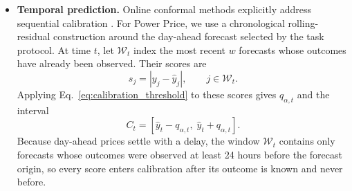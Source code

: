 \documentclass[preprint,12pt,authoryear]{elsarticle}
\begin{document}
\begin{itemize}
    A correctness scorer, trained on a separate scorer-training split
    and then frozen, produces \(r_i\in[0,1]\) from the observable task
    category and the generated selections. Calibration uses
    \begin{equation}
        s_i
        =
        Z_i(1-r_i)+(1-Z_i)r_i,
        \label{eq:statqa_nonconformity}
    \end{equation}
    yielding the correctness set
    \begin{equation}
        C_i
        =
        \left\{
            z\in\{0,1\}:
            z(1-r_i)+(1-z)r_i\leq\widehat q_\alpha
        \right\}.
        \label{eq:statqa_correctness_set}
    \end{equation}
    Reference answers supply offline training and calibration labels
    but are excluded from the scorer's inputs when assessing a new
    candidate. Thus, the calibrated target concerns the benchmark's
    structured analytical choices rather than unrestricted
    natural-language factuality.

    \item \textbf{Temporal prediction.}
    Online conformal methods explicitly address sequential calibration
    \citep{angelopoulos2024online}. For Power Price, we use a
    chronological rolling-residual construction around the day-ahead forecast selected by the task protocol. At time \(t\), let
    \(\mathcal{W}_t\) index the most recent \(w\) forecasts whose
    outcomes have already been observed. Their scores are
    \begin{equation}
        s_j
        =
        \left|y_j-\widehat y_j\right|,
        \qquad j\in\mathcal{W}_t.
        \label{eq:rolling_residual_scores}
    \end{equation}
    Applying Eq.~\eqref{eq:calibration_threshold} to these scores
    gives \(q_{\alpha,t}\) and the interval
    \begin{equation}
        C_t
        =
        \left[
            \widehat y_t-q_{\alpha,t},\;
            \widehat y_t+q_{\alpha,t}
        \right].
        \label{eq:rolling_calibrated_interval}
    \end{equation}
    Because day-ahead prices settle with a delay, the window \(\mathcal{W}_t\) contains only forecasts whose outcomes were observed at least 24 hours before the forecast origin, so every score enters calibration after its outcome is known and never before.

\end{itemize}
\end{document}
